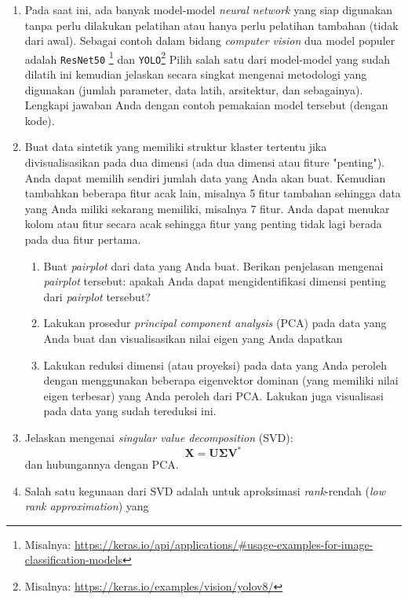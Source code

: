 \documentclass[a4paper,11pt]{article} %
\newcommand{\pyinline}[1]{\texttt{#1}}
\begin{document}
\begin{enumerate}
%
%
\item Pada saat ini, ada banyak model-model \textit{neural network}
yang siap digunakan tanpa perlu dilakukan
pelatihan atau hanya perlu pelatihan tambahan (tidak dari awal). Sebagai contoh
dalam bidang \textit{computer vision} dua model populer adalah
\pyinline{ResNet50} \footnote{Misalnya: \url{https://keras.io/api/applications/#usage-examples-for-image-classification-models}}
dan
\pyinline{YOLO}\footnote{Misalnya: \url{https://keras.io/examples/vision/yolov8/}}
Pilih salah satu dari model-model yang sudah dilatih ini kemudian jelaskan secara
singkat mengenai metodologi yang digunakan (jumlah parameter, data latih, arsitektur,
dan sebagainya). Lengkapi jawaban Anda dengan contoh pemakaian model tersebut (dengan
kode).
%
%
\item Buat data sintetik yang memiliki struktur klaster tertentu
jika divisualisasikan pada dua dimensi (ada dua dimensi atau fiture "penting").
Anda dapat memilih sendiri jumlah data yang Anda akan buat.
Kemudian tambahkan beberapa fitur acak lain, misalnya 5 fitur tambahan sehingga
data yang Anda miliki sekarang memiliki, misalnya 7 fitur. Anda dapat menukar
kolom atau fitur secara acak sehingga fitur yang penting tidak lagi berada
pada dua fitur pertama.
  \begin{enumerate}
    \item Buat \textit{pairplot} dari data yang Anda buat. Berikan penjelasan
    mengenai \textit{pairplot} tersebut: apakah Anda dapat mengidentifikasi
    dimensi penting dari \textit{pairplot} tersebut?
    \item Lakukan prosedur \textit{principal component analysis} (PCA) pada
    data yang Anda buat dan visualisasikan nilai eigen yang Anda dapatkan
    \item Lakukan reduksi dimensi (atau proyeksi) pada data yang Anda peroleh
    dengan menggunakan beberapa eigenvektor dominan (yang memiliki
    nilai eigen terbesar) yang Anda peroleh dari PCA. Lakukan juga visualisasi
    pada data yang sudah tereduksi ini.
  \end{enumerate}
%
%
\item Jelaskan mengenai \textit{singular value decomposition} (SVD):
\begin{equation*}
\mathbf{X} = \mathbf{U}\mathbf{\Sigma}\mathbf{V}^{*}
\end{equation*}
dan hubungannya dengan PCA.
%
%
\item Salah satu kegunaan dari SVD adalah untuk aproksimasi
\textit{rank}-rendah (\textit{low rank approximation}) yang

\end{enumerate}
\end{document}
